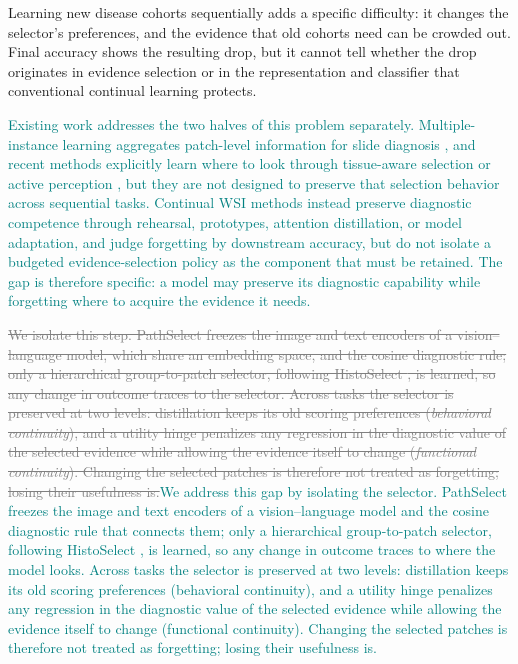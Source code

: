 \documentclass{article}
\newif\ifmarkup \markuptrue
\newcommand{\repc}[3]{\ifmarkup\textcolor{gray}{\sout{#2}}\textcolor{#1}{#3}\else#3\fi}
\newcommand{\repG}[2]{\repc{teal}{#1}{#2}}    %
\begin{document}
Learning new disease cohorts sequentially adds a specific difficulty: it changes the selector's preferences, and the evidence that old cohorts need can be crowded out. Final accuracy shows the resulting drop, but it cannot tell whether the drop originates in evidence selection or in the representation and classifier that conventional continual learning protects.

\repG{}{Existing work addresses the two halves of this problem separately. Multiple-instance learning aggregates patch-level information for slide diagnosis \cite{ilse2018abmil,lu2021clam,shao2021transmil}, and recent methods explicitly learn where to look through tissue-aware selection \cite{huang2026histoselect} or active perception \cite{chen2026adaptivepath}, but they are not designed to preserve that selection behavior across sequential tasks. Continual WSI methods \cite{huang2023conslide,meseguer2024micil,gou2025qpmil,li2025akd,lee2025comel,bui2026mergeslide} instead preserve diagnostic competence through rehearsal, prototypes, attention distillation, or model adaptation, and judge forgetting by downstream accuracy, but do not isolate a budgeted evidence-selection policy as the component that must be retained. The gap is therefore specific: a model may preserve its diagnostic capability while forgetting where to acquire the evidence it needs.}

\repG{We isolate this step. PathSelect freezes the image and text encoders of a vision--language model, which share an embedding space, and the cosine diagnostic rule; only a hierarchical group-to-patch selector, following HistoSelect \cite{huang2026histoselect}, is learned, so any change in outcome traces to the selector. Across tasks the selector is preserved at two levels: distillation keeps its old scoring preferences (\emph{behavioral continuity}), and a utility hinge penalizes any regression in the diagnostic value of the selected evidence while allowing the evidence itself to change (\emph{functional continuity}). Changing the selected patches is therefore not treated as forgetting; losing their usefulness is.}{We address this gap by isolating the selector. PathSelect freezes the image and text encoders of a vision--language model and the cosine diagnostic rule that connects them; only a hierarchical group-to-patch selector, following HistoSelect \cite{huang2026histoselect}, is learned, so any change in outcome traces to where the model looks. Across tasks the selector is preserved at two levels: distillation keeps its old scoring preferences (behavioral continuity), and a utility hinge penalizes any regression in the diagnostic value of the selected evidence while allowing the evidence itself to change (functional continuity). Changing the selected patches is therefore not treated as forgetting; losing their usefulness is.}
\end{document}

